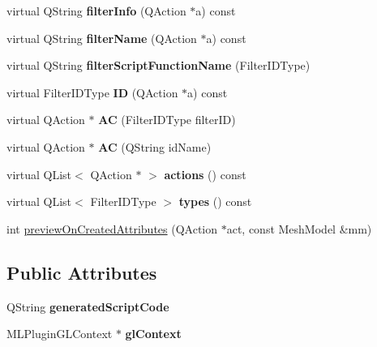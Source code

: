 \begin{DoxyCompactItemize}
\mbox{\label{class_mesh_filter_interface_ac32b2d9227bd65ce961bfbbda0958224}} 
virtual Q\+String {\bfseries filter\+Info} (Q\+Action $\ast$a) const
\item 
\mbox{\label{class_mesh_filter_interface_ad29fe0e78785523852d49e71f25d65de}} 
virtual Q\+String {\bfseries filter\+Name} (Q\+Action $\ast$a) const
\item 
\mbox{\label{class_mesh_filter_interface_a52850624e5aeb816260a7318cc6536b2}} 
virtual Q\+String {\bfseries filter\+Script\+Function\+Name} (Filter\+I\+D\+Type)
\item 
\mbox{\label{class_mesh_filter_interface_a65525c14f9ba9a4d904e2dff45f5351c}} 
virtual Filter\+I\+D\+Type {\bfseries ID} (Q\+Action $\ast$a) const
\item 
\mbox{\label{class_mesh_filter_interface_aac0d2b66c6fdd20ea9721d1cbfa43ae1}} 
virtual Q\+Action $\ast$ {\bfseries AC} (Filter\+I\+D\+Type filter\+ID)
\item 
\mbox{\label{class_mesh_filter_interface_a0b5f12b2324d55d9786dfa3578be4f24}} 
virtual Q\+Action $\ast$ {\bfseries AC} (Q\+String id\+Name)
\item 
\mbox{\label{class_mesh_filter_interface_aac9f631d1c5aa296b97e597267fe0bf0}} 
virtual Q\+List$<$ Q\+Action $\ast$ $>$ {\bfseries actions} () const
\item 
\mbox{\label{class_mesh_filter_interface_a6afdd9a931c5c71d76b7b0b5b9fbb4ff}} 
virtual Q\+List$<$ Filter\+I\+D\+Type $>$ {\bfseries types} () const
\item 
int \hyperlink{class_mesh_filter_interface_acbe7b0e88f3622b0faab5d16ab808148}{preview\+On\+Created\+Attributes} (Q\+Action $\ast$act, const Mesh\+Model \&mm)
\end{DoxyCompactItemize}
\subsection*{Public Attributes}
\begin{DoxyCompactItemize}
\item 
\mbox{\label{class_mesh_filter_interface_aa6eb72d9d3bce2b0204fd61501af104a}} 
Q\+String {\bfseries generated\+Script\+Code}
\item 
\mbox{\label{class_mesh_filter_interface_a3e981bd7643a2e798faf45a191f5e189}} 
M\+L\+Plugin\+G\+L\+Context $\ast$ {\bfseries gl\+Context}
\end{DoxyCompactItemize}
